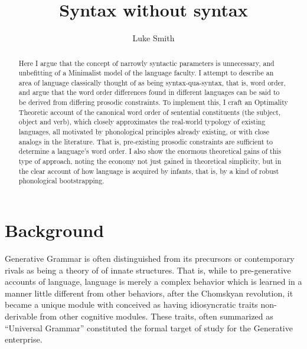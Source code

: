 \documentclass{article}
\title{Syntax without syntax}
\author{Luke Smith}
\begin{document}
\maketitle


\begin{abstract}
Here I argue that the concept of narrowly syntactic parameters is unnecessary, and unbefitting of a Minimalist model of the language faculty.
I attempt to describe an area of language classically thought of as being syntax-qua-syntax, that is, word order, and argue that the word order differences found in different languages can be said to be derived from differing prosodic constraints.
To implement this, I craft an Optimality Theoretic account of the canonical word order of sentential constituents (the subject, object and verb), which closely approximates the real-world typology of existing languages, all motivated by phonological principles already existing, or with close analogs in the literature.
That is, pre-existing prosodic constraints are sufficient to determine a language's word order.
I also show the enormous theoretical gains of this type of approach, noting the economy not just gained in theoretical simplicity, but in the clear account of how language is acquired by infants, that is, by a kind of robust phonological bootstrapping.
\end{abstract}



\section{Background}

Generative Grammar is often distinguished from its precursors or contemporary rivals as being a theory of of innate structures.
That is, while to pre-generative accounts of language, language is merely a complex behavior which is learned in a manner little different from other behaviors, after the Chomskyan revolution, it became a unique module with conceived as having idiosyncratic traits non-derivable from other cognitive modules.
These traits, often summarized as ``Universal Grammar'' constituted the formal target of study for the Generative enterprise.
\end{document}
